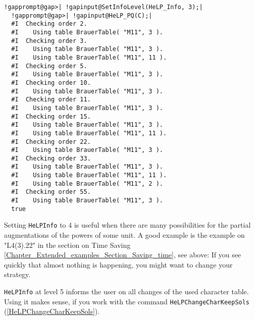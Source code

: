 \documentclass[a4paper,11pt]{report}
\begin{document}
{{\begin{Verbatim}[commandchars=!@|,fontsize=\small,frame=single,label=Example]
  !gapprompt@gap>| !gapinput@SetInfoLevel(HeLP_Info, 3);|
  !gapprompt@gap>| !gapinput@HeLP_PQ(C);|
  #I  Checking order 2.
  #I    Using table BrauerTable( "M11", 3 ).
  #I  Checking order 3.
  #I    Using table BrauerTable( "M11", 3 ).
  #I    Using table BrauerTable( "M11", 11 ).
  #I  Checking order 5.
  #I    Using table BrauerTable( "M11", 3 ).
  #I  Checking order 10.
  #I    Using table BrauerTable( "M11", 3 ).
  #I  Checking order 11.
  #I    Using table BrauerTable( "M11", 3 ).
  #I  Checking order 15.
  #I    Using table BrauerTable( "M11", 3 ).
  #I    Using table BrauerTable( "M11", 11 ).
  #I  Checking order 22.
  #I    Using table BrauerTable( "M11", 3 ).
  #I  Checking order 33.
  #I    Using table BrauerTable( "M11", 3 ).
  #I    Using table BrauerTable( "M11", 11 ).
  #I    Using table BrauerTable( "M11", 2 ).
  #I  Checking order 55.
  #I    Using table BrauerTable( "M11", 3 ).
  true
\end{Verbatim}
 Setting \texttt{HeLP{\textunderscore}Info} to 4 is useful when there are many possibilities for the partial augmentations
of the powers of some unit. A good example is the example on
"L4(3).2\texttt{}2" in the section on Time Saving \ref{Chapter_Extended_examples_Section_Saving_time}, see above: If you see quickly that almost nothing is happening, you might
want to change your strategy.

 \texttt{HeLP{\textunderscore}Info} at level 5 informs the user on all changes of the used character table. Using
it makes sense, if you work with the command \texttt{HeLP{\textunderscore}ChangeCharKeepSols} (\ref{HeLPChangeCharKeepSols}). }

 
}
\end{document}
